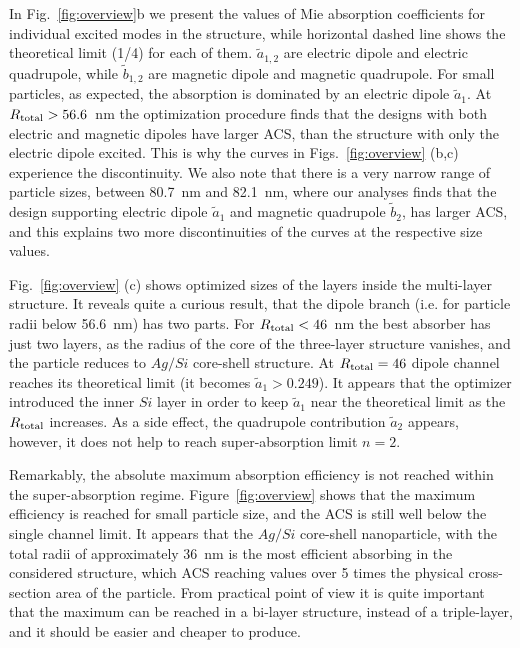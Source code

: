 \documentclass[aps,prl,twocolumn,showpacs,superscriptaddress,groupedaddress]{revtex4-1}
\begin{document}
In Fig.~\ref{fig:overview}b we present the values of Mie absorption
coefficients for individual excited modes in the structure, while
horizontal dashed line shows the theoretical limit (1/4) for each of
them. $\tilde{a}_{1,2}$ are electric dipole and electric quadrupole,
while $\tilde{b}_{1,2}$ are magnetic dipole and magnetic
quadrupole. For small particles, as expected, the absorption is
dominated by an electric dipole $\tilde{a}_1$.  At $R_{\rm total} >
56.6$~nm the optimization procedure finds that the designs with both
electric and magnetic dipoles have larger ACS, than the structure with
only the electric dipole excited. This is why the curves in
Figs.~\ref{fig:overview} (b,c) experience the discontinuity. We also
note that there is a very narrow range of particle sizes, between
80.7~nm and 82.1~nm, where our analyses finds that the design
supporting electric dipole $\tilde{a}_1$ and magnetic quadrupole
$\tilde{b}_2$, has larger ACS, and this explains two more
discontinuities of the curves at the respective size values.

Fig.~\ref{fig:overview} (c) shows optimized sizes of the layers inside
the multi-layer structure. It reveals quite a curious result, that the
dipole branch (i.e. for particle radii below 56.6~nm) has two
parts. For $R_{\rm total}<46$~nm the best absorber has just two
layers, as the radius of the core of the three-layer structure
vanishes, and the particle reduces to $Ag/Si$ core-shell structure.
At $R_{\rm total}=46$ dipole channel reaches its theoretical limit (it
becomes $\tilde{a}_1>0.249$).  It appears that the optimizer
introduced the inner $Si$ layer in order to keep $\tilde{a}_1$ near
the theoretical limit as the $R_{\rm total}$ increases.  As a side
effect, the quadrupole contribution $\tilde{a}_2$ appears, however, it
does not help to reach super-absorption limit $n=2$.

Remarkably, the absolute maximum absorption efficiency is not reached
within the super-absorption regime. Figure~\ref{fig:overview} shows
that the maximum efficiency is reached for small particle size, and
the ACS is still well below the single channel limit. It appears that
the $Ag/Si$ core-shell nanoparticle, with the total radii of
approximately 36~nm is the most efficient absorbing in the considered
structure, which ACS reaching values over 5 times the physical
cross-section area of the particle.  From practical point of view it
is quite important that the maximum can be reached in a bi-layer
structure, instead of a triple-layer, and it should be easier and
cheaper to produce.
\end{document}
